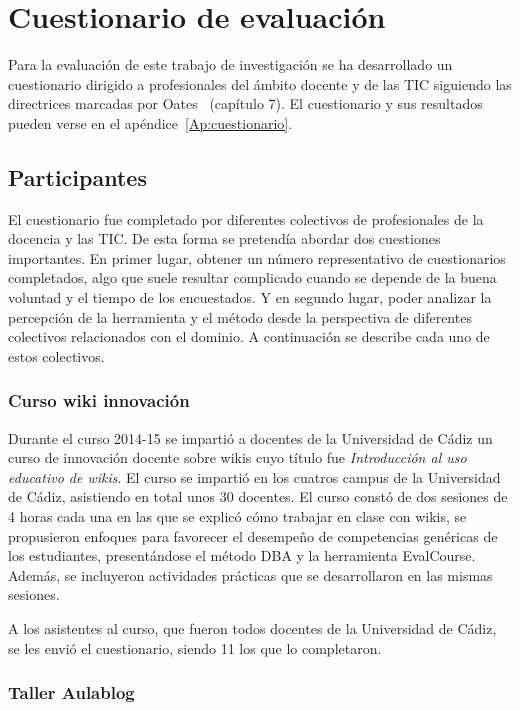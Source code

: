 \section{Cuestionario de evaluación}

	Para la evaluación de este trabajo de investigación se ha desarrollado un cuestionario dirigido a profesionales del ámbito docente y de las TIC siguiendo las directrices marcadas por Oates~\cite{oates2006researching} (capítulo 7).  El cuestionario y sus resultados pueden verse en el apéndice~\ref{Ap:cuestionario}. 

\subsection{Participantes} \label{eva:participantes}

El cuestionario fue completado por diferentes colectivos de profesionales de la docencia y las TIC. De esta forma se pretendía abordar dos cuestiones importantes. En primer lugar, obtener un número representativo de cuestionarios completados, algo que suele resultar complicado cuando se depende de la buena voluntad y el tiempo de los encuestados. Y en segundo lugar, poder analizar la percepción de la herramienta y el método desde la perspectiva de diferentes colectivos relacionados con el dominio. A continuación se describe cada uno de estos colectivos.

	\subsubsection{Curso wiki innovación}

		Durante el curso 2014-15 se impartió a docentes de la Universidad de Cádiz un curso de innovación docente sobre wikis cuyo título fue \emph{Introducción al uso educativo de wikis}. El curso se impartió en los cuatros campus de la Universidad de Cádiz, asistiendo en total unos 30 docentes. El curso constó de dos sesiones de 4 horas cada una en las que se explicó cómo trabajar en clase con wikis, se propusieron enfoques para favorecer el desempeño de competencias genéricas de los estudiantes, presentándose el método DBA y la herramienta EvalCourse.  Además, se incluyeron actividades prácticas que se desarrollaron en las mismas sesiones. 

A los asistentes al curso, que fueron todos docentes de la Universidad de Cádiz, se les envió el cuestionario, siendo 11 los que lo completaron.

	\subsubsection{Taller Aulablog}

